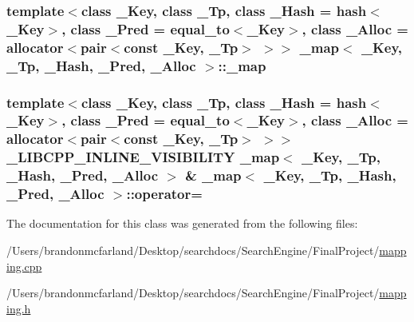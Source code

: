 \subsubsection[{\+\_\+map}]{\setlength{\rightskip}{0pt plus 5cm}template$<$class \+\_\+\+Key, class \+\_\+\+Tp, class \+\_\+\+Hash = hash$<$\+\_\+\+Key$>$, class \+\_\+\+Pred = equal\+\_\+to$<$\+\_\+\+Key$>$, class \+\_\+\+Alloc = allocator$<$pair$<$const \+\_\+\+Key, \+\_\+\+Tp$>$ $>$$>$ {\bf \+\_\+map}$<$ \+\_\+\+Key, \+\_\+\+Tp, \+\_\+\+Hash, \+\_\+\+Pred, \+\_\+\+Alloc $>$\+::{\bf \+\_\+map}\hspace{0.3cm}{\ttfamily [inline]}}\label{class__map_ab80a3b67fd9ac75a76a8e67ed145ec49}
\hypertarget{class__map_a296cacc5b7bac84a0e4dbbbd45f7b6b1}{}
\subsubsection[{operator=}]{\setlength{\rightskip}{0pt plus 5cm}template$<$class \+\_\+\+Key, class \+\_\+\+Tp, class \+\_\+\+Hash = hash$<$\+\_\+\+Key$>$, class \+\_\+\+Pred = equal\+\_\+to$<$\+\_\+\+Key$>$, class \+\_\+\+Alloc = allocator$<$pair$<$const \+\_\+\+Key, \+\_\+\+Tp$>$ $>$$>$ \+\_\+\+L\+I\+B\+C\+P\+P\+\_\+\+I\+N\+L\+I\+N\+E\+\_\+\+V\+I\+S\+I\+B\+I\+L\+I\+T\+Y {\bf \+\_\+map}$<$ \+\_\+\+Key, \+\_\+\+Tp, \+\_\+\+Hash, \+\_\+\+Pred, \+\_\+\+Alloc $>$ \& {\bf \+\_\+map}$<$ \+\_\+\+Key, \+\_\+\+Tp, \+\_\+\+Hash, \+\_\+\+Pred, \+\_\+\+Alloc $>$\+::operator=\hspace{0.3cm}{\ttfamily [inline]}}\label{class__map_a296cacc5b7bac84a0e4dbbbd45f7b6b1}


The documentation for this class was generated from the following files\+:\begin{DoxyCompactItemize}
\item 
/\+Users/brandonmcfarland/\+Desktop/searchdocs/\+Search\+Engine/\+Final\+Project/\hyperlink{mapping_8cpp}{mapping.\+cpp}\item 
/\+Users/brandonmcfarland/\+Desktop/searchdocs/\+Search\+Engine/\+Final\+Project/\hyperlink{mapping_8h}{mapping.\+h}\end{DoxyCompactItemize}

